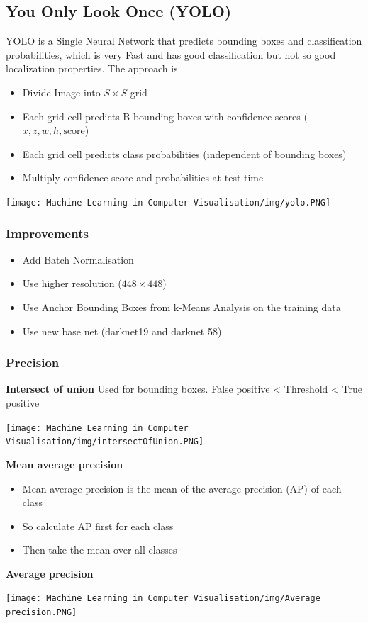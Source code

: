 \documentclass[x11names,11pt,a4paper]{article}
\theoremstyle{definition}
\begin{document}
\subsection{You Only Look Once (YOLO)}
YOLO is a Single Neural Network that predicts bounding boxes and classification probabilities, which is very Fast and has good classification but not so good localization properties. The approach is
\begin{itemize}[label=-,nosep]
	\item Divide Image into $S \times S$ grid
	\item Each grid cell predicts B bounding boxes with confidence scores ($x, z, w, h, \text{score}$)
	\item Each grid cell predicts class probabilities (independent of bounding boxes)
	\item Multiply confidence score and probabilities at test time
\end{itemize}

\begin{center}
	\texttt{[image: Machine Learning in Computer Visualisation/img/yolo.PNG]}
\end{center}

\subsubsection{Improvements}
\begin{itemize}[label=-]
	\item Add Batch Normalisation
	\item Use higher resolution ($448\times 448$)
	\item Use Anchor Bounding Boxes from k-Means Analysis on the training data
	\item Use new base net (darknet19 and darknet 58)
\end{itemize}

\subsubsection{Precision}
\textbf{Intersect of union}
Used for bounding boxes.\newline
False positive < Threshold < True positive
\begin{center}
	\texttt{[image: Machine Learning in Computer Visualisation/img/intersectOfUnion.PNG]}
\end{center}
\textbf{Mean average precision}
\begin{itemize}
    \item Mean average precision is the mean of the average precision (AP) of each class
    \item So calculate AP first for each class
    \item Then take the mean over all classes
\end{itemize}
\textbf{Average precision}
\begin{center}
	\texttt{[image: Machine Learning in Computer Visualisation/img/Average precision.PNG]}
\end{center}
\end{document}

